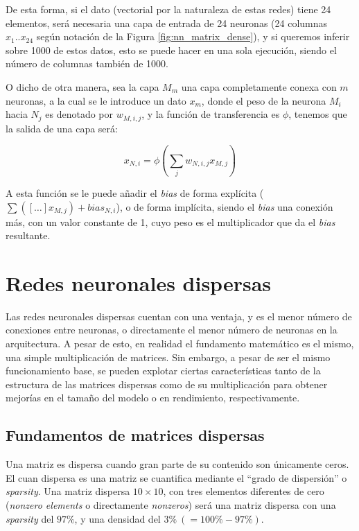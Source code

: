 De esta forma, si el dato (vectorial por la naturaleza de estas redes) tiene 24 elementos, será necesaria una capa de entrada de 24 neuronas (24 columnas $x_{1} .. x_{24}$ según notación de la Figura \ref{fig:nn_matrix_dense}), y si queremos inferir sobre 1000 de estos datos, esto se puede hacer en una sola ejecución, siendo el número de columnas también de 1000.

O dicho de otra manera, sea la capa $M_{m}$ una capa completamente conexa con $m$ neuronas, a la cual se le introduce un dato $x_{m}$, donde el peso de la neurona $M_{i}$ hacia $N_{j}$ es denotado por $w_{M,i,j}$, y la función de transferencia es $\phi$, tenemos que la salida de una capa será:

\begin{equation}
    x_{N,i} = \phi\left(\sum_{j}w_{N,i,j}x_{M,j}\right)
    \label{eq:dense_nn_eq}
\end{equation}

A esta función se le puede añadir el \textit{bias} de forma explícita ($\sum\left([\dots] x_{M,j}\right) + bias_{N,i}$), o de forma implícita, siendo el \textit{bias} una conexión más, con un valor constante de 1, cuyo peso es el multiplicador que da el \textit{bias} resultante.

\section{Redes neuronales dispersas}
\label{sec:redes_reuronales_dispersas}
Las redes neuronales dispersas cuentan con una ventaja, y es el menor número de conexiones entre neuronas, o directamente el menor número de neuronas en la arquitectura. A pesar de esto, en realidad el fundamento matemático es el mismo, una simple multiplicación de matrices. Sin embargo, a pesar de ser el mismo funcionamiento base, se pueden explotar ciertas características tanto de la estructura de las matrices dispersas como de su multiplicación para obtener mejorías en el tamaño del modelo o en rendimiento, respectivamente.

\subsection{Fundamentos de matrices dispersas}
\label{ssec:fundamentos_matrices_dispersas}
Una matriz es dispersa cuando gran parte de su contenido son únicamente ceros. El cuan dispersa es una matriz se cuantifica mediante el ``grado de dispersión'' o \textit{sparsity}. Una matriz dispersa $10 \times 10$, con tres elementos diferentes de cero (\textit{nonzero elements} o directamente \textit{nonzeros}) será una matriz dispersa con una \textit{sparsity} del $97\%$, y una densidad del $3\% \:(=100\%-97\%)$.

